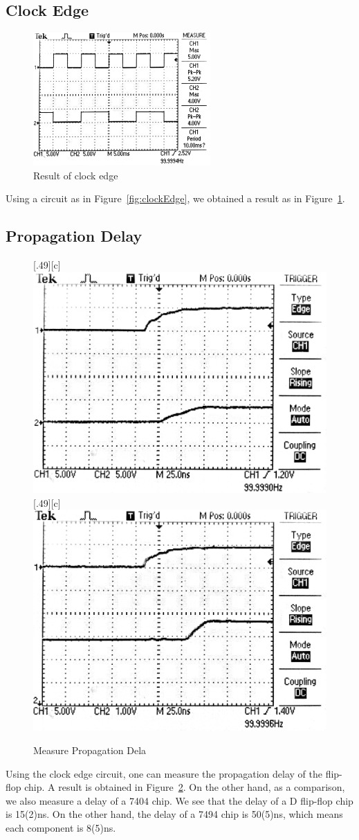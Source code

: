 \documentclass[aps,prl,reprint]{revtex4-1}
\begin{document}
    \subsection{Clock Edge}
        \begin{figure}[h]
            \centering
            \includegraphics[height=2in]{image/clock-edge-lab.pdf}
            \caption{Result of clock edge}
            \label{fig:clockEdgeLab}
        \end{figure}
        Using a circuit as in Figure~\ref{fig:clockEdge}, we obtained a result as in Figure~\ref{fig:clockEdgeLab}.
    \subsection{Propagation Delay}
        \begin{figure}[h]
            \centering
            [.49\linewidth][c]{%
                \includegraphics[width=.49\linewidth]{image/delay1.pdf}}
            [.49\linewidth][c]{%
                \includegraphics[width=.49\linewidth]{image/delay2.pdf}}
            \caption{Measure Propagatio{}n Dela}
            \label{fig:delay}
        \end{figure}
        Using the clock edge circuit, one can measure the propagation delay of the flip-flop chip. A result is obtained in Figure~\ref{fig:delay}. On the other hand, as a comparison, we also measure a delay of a 7404 chip. We see that the delay of a D flip-flop chip is 15(2)ns. On the other hand, the delay of a 7494 chip is 50(5)ns, which means each component is 8(5)ns.
\end{document}
